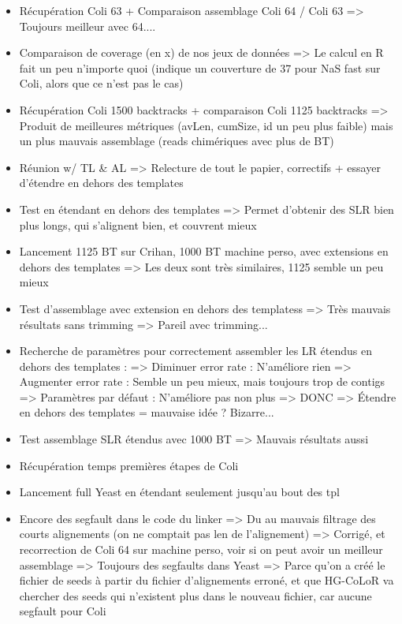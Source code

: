 \documentclass[12pt]{report}
\begin{document}
\begin{itemize}
	\item Récupération Coli 63 + Comparaison assemblage Coli 64 / Coli 63 => Toujours meilleur avec 64....
	
	\item Comparaison de coverage (en x) de nos jeux de données => Le calcul en R fait un peu n'importe quoi
		  (indique un couverture de 37 pour NaS fast sur Coli, alors que ce n'est pas le cas)
	
	\item Récupération Coli 1500 backtracks + comparaison Coli 1125 backtracks => Produit de meilleures métriques (avLen, cumSize, id un
		  peu plus faible) mais un plus mauvais assemblage (reads chimériques avec plus de BT)
	
	\item Réunion w/ TL \& AL => Relecture de tout le papier, correctifs + essayer d'étendre en dehors des templates
		  
	\item Test en étendant en dehors des templates => Permet d'obtenir des SLR bien plus longs, qui s'alignent bien, et couvrent mieux
	
	\item Lancement 1125 BT sur Crihan, 1000 BT machine perso, avec extensions en dehors des templates
		  => Les deux sont très similaires, 1125 semble un peu mieux
	
	\item Test d'assemblage avec extension en dehors des templatess => Très mauvais résultats sans trimming
		                                                            => Pareil avec trimming...
		                                                           
	\item Recherche de paramètres pour correctement assembler les LR étendus en dehors des templates :
			=> Diminuer error rate : N'améliore rien
			=> Augmenter error rate : Semble un peu mieux, mais toujours trop de contigs
			=> Paramètres par défaut : N'améliore pas non plus
		  => DONC => Étendre en dehors des templates = mauvaise idée ? Bizarre...
		  
	\item Test assemblage SLR étendus avec 1000 BT => Mauvais résultats aussi
	
	\item Récupération temps premières étapes de Coli
		                                                           
	\item Lancement full Yeast en étendant seulement jusqu'au bout des tpl
	
	\item Encore des segfault dans le code du linker => Du au mauvais filtrage des courts alignements (on ne comptait pas len de l'alignement)
		  => Corrigé, et recorrection de Coli 64 sur machine perso, voir si on peut avoir un meilleur assemblage
		  => Toujours des segfaults dans Yeast
		  => Parce qu'on a créé le fichier de seeds à partir du fichier d'alignements erroné,
		  	 et que HG-CoLoR va chercher des seeds qui n'existent plus dans le nouveau fichier, car aucune segfault pour Coli
\end{itemize}
\end{document}
